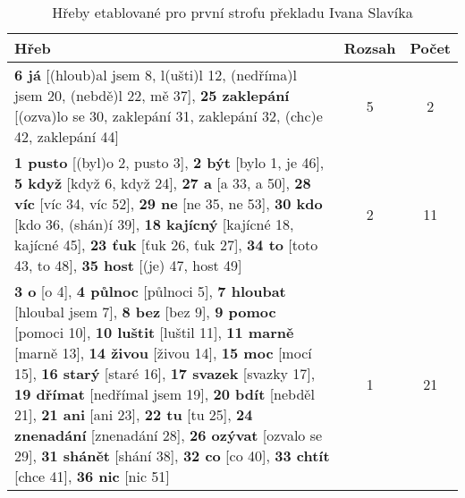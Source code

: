 \documentclass[dp.tex]{subfiles}
\begin{document}
\begin {table}[H]
	\caption {Hřeby etablované pro první strofu překladu Ivana Slavíka} 
	\label{tab:hreby-1-strofa-slavik} 

	\begin{center}
		\begin{tabular}{|p{10cm}|c|c|}
		\hline 
		\bfseries Hřeb & \bfseries Rozsah & \bfseries Počet \\ \hline
		\textbf{6 já} [(hloub)al jsem 8, l(ušti)l 12, (nedříma)l jsem 20, (nebdě)l 22, mě 37], \textbf{25 zaklepání} [(ozva)lo se 30, zaklepání 31, zaklepání 32, (chc)e 42, zaklepání 44] 
		& 5 & 2 \\ \hline
		
		\textbf{1 pusto} [(byl)o 2, pusto 3], \textbf{2 být} [bylo 1, je 46], \textbf{5 když} [když 6, když 24], \textbf{27 a} [a 33, a 50], \textbf{28 víc} [víc 34, víc 52], \textbf{29 ne} [ne 35, ne 53], \textbf{30 kdo} [kdo 36, (shán)í 39], \textbf{18 kajícný} [kajícné 18, kajícné 45], \textbf{23 ťuk} [ťuk 26, ťuk 27], \textbf{34 to} [toto 43, to 48], \textbf{35 host} [(je) 47, host 49] 
		& 2 & 11\\ \hline
		
		\textbf{3 o} [o 4], \textbf{4 půlnoc} [půlnoci 5], \textbf{7 hloubat} [hloubal jsem 7], \textbf{8 bez} [bez 9], \textbf{9 pomoc} [pomoci 10], \textbf{10 luštit} [luštil 11], \textbf{11 marně} [marně 13], \textbf{14 živou} [živou 14], \textbf{15 moc} [mocí 15], \textbf{16 starý} [staré 16], \textbf{17 svazek} [svazky 17], \textbf{19 dřímat} [nedřímal jsem 19], \textbf{20 bdít} [nebděl 21], \textbf{21 ani} [ani 23], \textbf{22 tu} [tu 25], \textbf{24 znenadání} [znenadání 28], \textbf{26 ozývat} [ozvalo se 29], \textbf{31 shánět} [shání 38], \textbf{32 co} [co 40], \textbf{33 chtít} [chce 41], \textbf{36 nic} [nic 51]
		& 1 & 21 \\ \hline

		\end{tabular} 
	\end{center}
\end{table}
\end{document}
